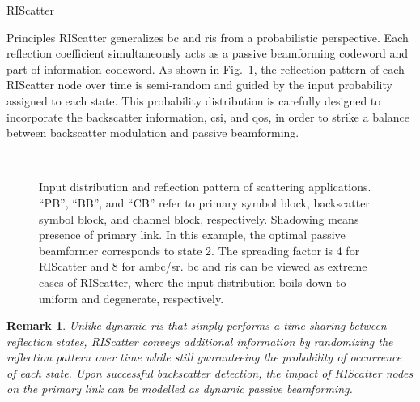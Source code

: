 \documentclass[journal]{IEEEtran}
\newtheorem{remark}{Remark}
\begin{document}
\begin{section}{RIScatter}
\begin{subsection}{Principles}
		RIScatter generalizes \gls{bc} and \gls{ris} from a probabilistic perspective.
		Each reflection coefficient simultaneously acts as a passive beamforming codeword and part of information codeword.
		As shown in Fig.~\ref{fg:scatter_comparison}, the reflection pattern of each RIScatter node over time is semi-random and guided by the input probability assigned to each state.
		This probability distribution is carefully designed to incorporate the backscatter information, \gls{csi}, and \gls{qos}, in order to strike a balance between backscatter modulation and passive beamforming.
		\begin{figure}[!t]
			\centering
			\\
			\caption{
				Input distribution and reflection pattern of scattering applications.
				``PB'', ``BB'', and ``CB'' refer to primary symbol block, backscatter symbol block, and channel block, respectively.
				Shadowing means presence of primary link.
				In this example, the optimal passive beamformer corresponds to state \num{2}.
				The spreading factor is \num{4} for RIScatter and \num{8} for \gls{ambc}/\gls{sr}.
				\gls{bc} and \gls{ris} can be viewed as extreme cases of RIScatter, where the input distribution boils down to uniform and degenerate, respectively.
			}
			\label{fg:scatter_comparison}
		\end{figure}
		\begin{remark}
			Unlike dynamic \gls{ris} that simply performs a time sharing between reflection states, RIScatter conveys additional information by randomizing the reflection pattern over time while still guaranteeing the probability of occurrence of each state.
			Upon successful backscatter detection, the impact of RIScatter nodes on the primary link can be modelled as dynamic passive beamforming.
			\label{re:dynamic_passive_beamforming}
		\end{remark}


\end{subsection}
\end{section}
\end{document}
